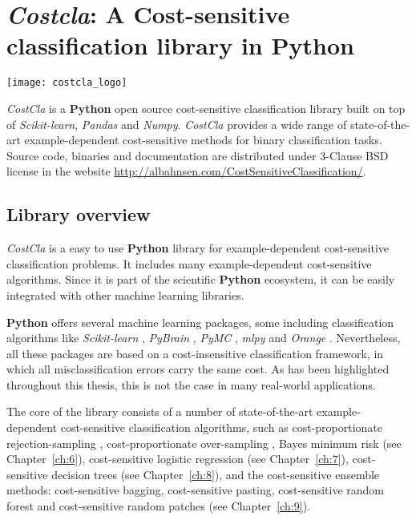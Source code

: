 \chapter{\textit{Costcla}: A Cost-sensitive classification library in \textbf{Python}}\label{ch:A}


\begin{center}
 \texttt{[image: costcla\_logo]}
\end{center}

\begin{remark}
\textit{CostCla} is a \textbf{Python} open source cost-sensitive classification library built on 
top of \textit{Scikit-learn}, \textit{Pandas} and \textit{Numpy}. \textit{CostCla} provides a wide 
range of state-of-the-art example-dependent cost-sensitive methods for binary classification tasks. 
Source code, binaries and documentation are distributed under 3-Clause BSD license in the website 
\url{http://albahnsen.com/CostSensitiveClassification/}.
\end{remark}
  
\section{Library overview}

\textit{CostCla} is a easy to use \textbf{Python} library for example-dependent cost-sensitive 
classification problems. It includes many example-dependent cost-sensitive algorithms. Since 
it is part of the scientific \textbf{Python} ecosystem, it can be easily integrated with other 
machine learning libraries.

\textbf{Python} offers several machine learning packages, some including classification algorithms 
like \textit{Scikit-learn} \citep{Pedregosa2011}, \textit{PyBrain} \citep{Schaul2010}, 
\textit{PyMC} \citep{Patil2010}, \textit{mlpy} \citep{Albanese2012} and \textit{Orange} 
\citep{Demsar2013}. Nevertheless, all these packages are based on a cost-insensitive classification
 framework, in which all misclassification errors carry the same cost. As has been highlighted 
 throughout this thesis, this is not the case in many real-world applications. 

The core of the library consists of a number of state-of-the-art example-dependent cost-sensitive 
classification algorithms, such as cost-proportionate rejection-sampling \citep{Zadrozny2003}, 
cost-proportionate over-sampling \citep{Elkan2001}, Bayes minimum risk (see Chapter~\ref{ch:6}), 
cost-sensitive logistic regression (see Chapter~\ref{ch:7}), cost-sensitive decision trees (see 
Chapter~\ref{ch:8}), and the cost-sensitive ensemble methods: cost-sensitive bagging, cost-sensitive 
pasting, cost-sensitive random forest and cost-sensitive random patches (see Chapter~\ref{ch:9}).

